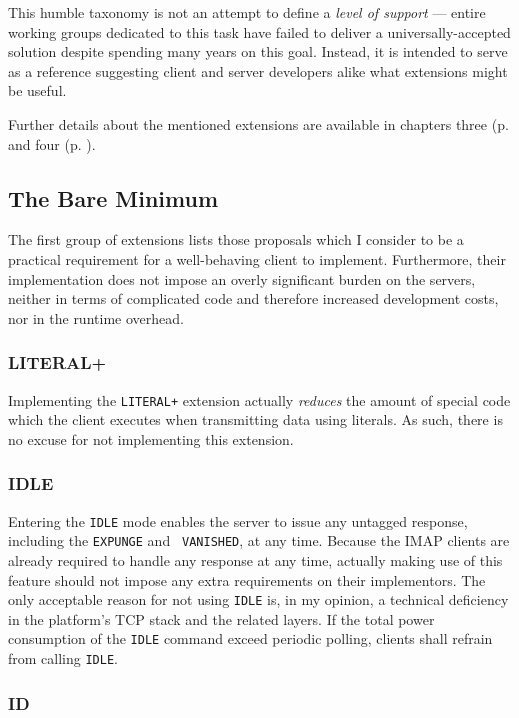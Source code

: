\documentclass[trojita]{subfiles}
\begin{document}
This humble taxonomy is not an attempt to define a {\em level of support} --- entire working groups dedicated to this
task have failed to deliver a universally-accepted solution despite spending many years on this goal.  Instead, it is
intended to serve as a reference suggesting client and server developers alike what extensions might be useful.

Further details about the mentioned extensions are available in chapters three (p.  \pageref{sec:imap-extensions} and
four (p. \pageref{sec:proposed-extensions}).

\subsection{The Bare Minimum}

The first group of extensions lists those proposals which I consider to be a practical requirement for a well-behaving
client to implement.  Furthermore, their implementation does not impose an overly significant burden on the servers,
neither in terms of complicated code and therefore increased development costs, nor in the runtime overhead.

\subsubsection{LITERAL+}

Implementing the {\tt LITERAL+} extension actually {\em reduces} the amount of special code which the client executes
when transmitting data using literals.  As such, there is no excuse for not implementing this extension.

\subsubsection{IDLE}

Entering the {\tt IDLE} mode enables the server to issue any untagged response, including the {\tt EXPUNGE} and {\tt
VANISHED}, at any time.  Because the IMAP clients are already required to handle any response at any time, actually
making use of this feature should not impose any extra requirements on their implementors.  The only acceptable reason
for not using {\tt IDLE} is, in my opinion, a technical deficiency in the platform's TCP stack and the related layers.
If the total power consumption of the {\tt IDLE} command exceed periodic polling, clients shall refrain from calling
{\tt IDLE}.

\subsubsection{ID}
\end{document}
